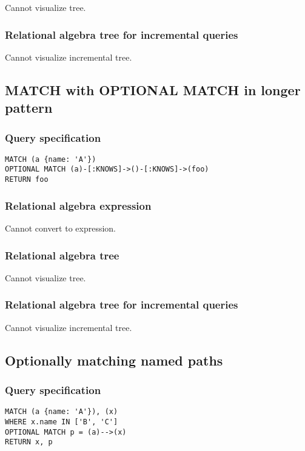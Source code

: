 Cannot visualize tree.

\subsubsection*{Relational algebra tree for incremental queries}

Cannot visualize incremental tree.

\subsection{MATCH with OPTIONAL MATCH in longer pattern}

\subsubsection*{Query specification}

\begin{lstlisting}
MATCH (a {name: 'A'})
OPTIONAL MATCH (a)-[:KNOWS]->()-[:KNOWS]->(foo)
RETURN foo
\end{lstlisting}

\subsubsection*{Relational algebra expression}

Cannot convert to expression.

\subsubsection*{Relational algebra tree}

Cannot visualize tree.

\subsubsection*{Relational algebra tree for incremental queries}

Cannot visualize incremental tree.

\subsection{Optionally matching named paths}

\subsubsection*{Query specification}

\begin{lstlisting}
MATCH (a {name: 'A'}), (x)
WHERE x.name IN ['B', 'C']
OPTIONAL MATCH p = (a)-->(x)
RETURN x, p
\end{lstlisting}

